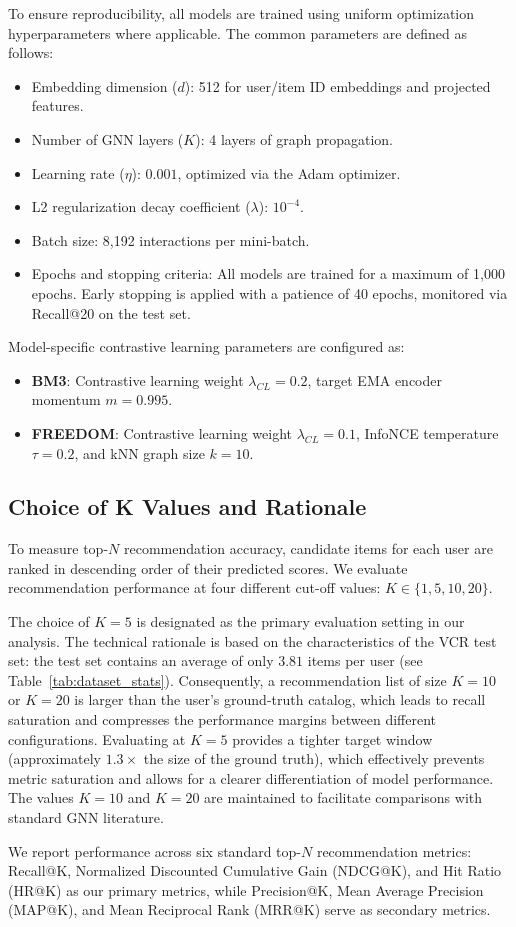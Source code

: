 To ensure reproducibility, all models are trained using uniform optimization hyperparameters where applicable. The common parameters are defined as follows:
\begin{itemize}
    \item Embedding dimension ($d$): 512 for user/item ID embeddings and projected features.
    \item Number of GNN layers ($K$): 4 layers of graph propagation.
    \item Learning rate ($\eta$): $0.001$, optimized via the Adam optimizer.
    \item L2 regularization decay coefficient ($\lambda$): $10^{-4}$.
    \item Batch size: 8,192 interactions per mini-batch.
    \item Epochs and stopping criteria: All models are trained for a maximum of 1,000 epochs. Early stopping is applied with a patience of 40 epochs, monitored via Recall@20 on the test set.
\end{itemize}
Model-specific contrastive learning parameters are configured as:
\begin{itemize}
    \item \textbf{BM3}: Contrastive learning weight $\lambda_{CL} = 0.2$, target EMA encoder momentum $m = 0.995$.
    \item \textbf{FREEDOM}: Contrastive learning weight $\lambda_{CL} = 0.1$, InfoNCE temperature $\tau = 0.2$, and kNN graph size $k = 10$.
\end{itemize}

\subsection{Choice of K Values and Rationale}

To measure top-$N$ recommendation accuracy, candidate items for each user are ranked in descending order of their predicted scores. We evaluate recommendation performance at four different cut-off values: $K \in \{1, 5, 10, 20\}$. 

The choice of $K=5$ is designated as the primary evaluation setting in our analysis. The technical rationale is based on the characteristics of the VCR test set: the test set contains an average of only $3.81$ items per user (see Table~\ref{tab:dataset_stats}). Consequently, a recommendation list of size $K=10$ or $K=20$ is larger than the user's ground-truth catalog, which leads to recall saturation and compresses the performance margins between different configurations. Evaluating at $K=5$ provides a tighter target window (approximately $1.3\times$ the size of the ground truth), which effectively prevents metric saturation and allows for a clearer differentiation of model performance. The values $K=10$ and $K=20$ are maintained to facilitate comparisons with standard GNN literature.

We report performance across six standard top-$N$ recommendation metrics: Recall@K, Normalized Discounted Cumulative Gain (NDCG@K), and Hit Ratio (HR@K) as our primary metrics, while Precision@K, Mean Average Precision (MAP@K), and Mean Reciprocal Rank (MRR@K) serve as secondary metrics.
